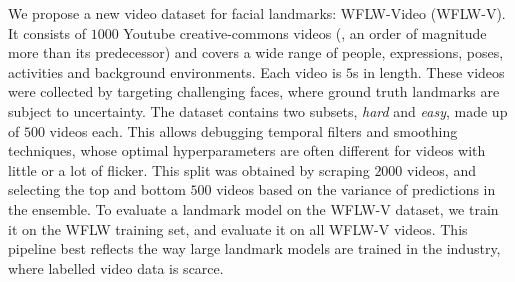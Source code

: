 \documentclass[10pt,twocolumn,letterpaper]{article}
\begin{document}
We propose a new video dataset for facial landmarks: WFLW-Video (WFLW-V). It consists of $1000$ Youtube creative-commons videos (\ie, an order of magnitude more than its predecessor) and covers a wide range of people, expressions, poses, activities and background environments. Each video is $5$s in length. These videos were collected by targeting challenging faces, where ground truth landmarks are subject to uncertainty. The dataset contains two subsets, \textit{hard} and \textit{easy}, made up of $500$ videos each. This allows debugging temporal filters and smoothing techniques, whose optimal hyperparameters are often different for videos with little or a lot of flicker. This split was obtained by scraping $2000$ videos, and selecting the top and bottom $500$ videos based on the variance of predictions in the ensemble. To evaluate a landmark model on the WFLW-V dataset, we train it on the WFLW training set, and evaluate it on all WFLW-V videos. This pipeline best reflects the way large landmark models are trained in the industry, where labelled video data is scarce.
\end{document}
